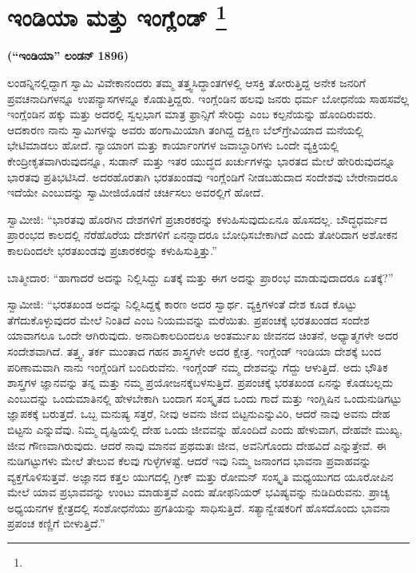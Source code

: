 
\chapter[ಇಂಡಿಯಾ ಮತ್ತು ಇಂಗ್ಲೆಂಡ್ ]{ಇಂಡಿಯಾ ಮತ್ತು ಇಂಗ್ಲೆಂಡ್ \protect\footnote{}}

\centerline{\textbf{(“ಇಂಡಿಯಾ” ಲಂಡನ್​ 1896)}}

ಲಂಡನ್ನಿನಲ್ಲಿದ್ದಾಗ ಸ್ವಾಮಿ ವಿವೇಕಾನಂದರು ತಮ್ಮ ತತ್ತ್ವಸಿದ್ಧಾಂತಗಳಲ್ಲಿ ಆಸಕ್ತಿ ತೋರುತ್ತಿದ್ದ ಅನೇಕ ಜನರಿಗೆ ಪ್ರವಚನಾದಿಗಳನ್ನೂ ಉಪನ್ಯಾಸಗಳನ್ನೂ ಕೊಡುತ್ತಿದ್ದರು. ಇಂಗ್ಲೆಂಡಿನ ಹಲವು ಜನರು ಧರ್ಮ ಬೋಧನೆಯ ಸಾಹಸವೆಲ್ಲ ಇಂಗ್ಲೆಂಡಿನ ಹಕ್ಕು ಮತ್ತು ಅದರಲ್ಲಿ ಸ್ವಲ್ಪಭಾಗ ಮಾತ್ರ ಫ್ರಾನ್ಸಿಗೆ ಸೇರಿದ್ದು ಎಂಬ ಕಲ್ಪನೆಯನ್ನು ಹೊಂದಿರುವರು. ಆದಕಾರಣ ನಾನು ಸ್ವಾಮಿಗಳನ್ನು ಅವರು ಹಂಗಾಮಿಯಾಗಿ ತಂಗಿದ್ದ ದಕ್ಷಿಣ ಬೆಲ್​ಗ್ರೇವಿಯಾದ ಮನೆಯಲ್ಲಿ ಭೇಟಿಮಾಡಲು ಹೋದೆ. ನ್ಯಾಯಾಂಗ ಮತ್ತು ಕಾರ್ಯಾಂಗಗಳ ಜವಾಬ್ದಾರಿಗಳು ಒಂದೇ ವ್ಯಕ್ತಿಯಲ್ಲಿ ಕೇಂದ್ರೀಕೃತವಾಗಿರುವುದನ್ನೂ, ಸುಡಾನ್​ ಮತ್ತು ಇತರ ಯುದ್ಧದ ಖರ್ಚುಗಳನ್ನು ಭಾರತದ ಮೇಲೆ ಹೇರಿರುವುದನ್ನೂ ಭಾರತವು ಪ್ರತಿಭಟಿಸಿದೆ. ಅದರ\break ಹೊರತಾಗಿ ಭರತಖಂಡವು ಇಂಗ್ಲೆಂಡಿಗೆ ನೀಡಬಹುದಾದ ಸಂದೇಶವು ಬೇರೇನಾದರೂ ಇದೆಯೇ ಎಂಬುದನ್ನು ಸ್ವಾಮೀಜಿಯೊಡನೆ ಚರ್ಚಿಸಲು ಅವರಲ್ಲಿಗೆ ಹೋದೆ.

ಸ್ವಾಮೀಜಿ: “ಭಾರತವು ಹೊರಗಿನ ದೇಶಗಳಿಗೆ ಪ್ರಚಾರಕರನ್ನು ಕಳುಹಿಸುವುದು\break ಏನೂ ಹೊಸದಲ್ಲ. ಬೌದ್ಧಧರ್ಮದ ಪ್ರಾರಂಭದ ಕಾಲದಲ್ಲಿ ನೆರೆಹೊರೆಯ ದೇಶಗಳಿಗೆ ಏನನ್ನಾದರೂ ಬೋಧಿಸಬೇಕಾಗಿದೆ ಎಂದು ತೋರಿದಾಗ ಅಶೋಕನ ಕಾಲದಿಂದಲೇ ಭರತಖಂಡವು ಪ್ರಚಾರಕರನ್ನು ಕಳುಹಿಸುತ್ತಿತ್ತು.”

ಬಾತ್ಮೀದಾರ: “ಹಾಗಾದರೆ ಅದನ್ನು ನಿಲ್ಲಿಸಿದ್ದು ಏತಕ್ಕೆ ಮತ್ತು ಈಗ ಅದನ್ನು ಪ್ರಾರಂಭ ಮಾಡುವುದಾದರೂ ಏತಕ್ಕೆ?”

ಸ್ವಾಮೀಜಿ: “ಭರತಖಂಡ ಅದನ್ನು ನಿಲ್ಲಿಸಿದ್ದಕ್ಕೆ ಕಾರಣ ಅದರ ಸ್ವಾರ್ಥ. ವ್ಯಕ್ತಿಗಳಂತೆ ದೇಶ ಕೂಡ ಕೊಟ್ಟು ತೆಗೆದುಕೊಳ್ಳುವುದರ ಮೇಲೆ ನಿಂತಿದೆ ಎಂಬ ನಿಯಮವನ್ನು ಮರೆಯಿತು. ಪ್ರಪಂಚಕ್ಕೆ ಭರತಖಂಡದ ಸಂದೇಶ ಯಾವಾಗಲೂ ಒಂದೇ ಆಗಿರುವುದು. ಅನಾದಿಕಾಲದಿಂದಲೂ ಅಂತರ್ಮುಖ ಜೀವನದ ಚಿಂತನೆ, ಅಧ್ಯಾತ್ಮಗಳೇ ಅದರ ಸಂದೇಶವಾಗಿದೆ. ತತ್ತ್ವ, ತರ್ಕ ಮುಂತಾದ ಗಹನ ಶಾಸ್ತ್ರಗಳೇ ಅದರ ಕ್ಷೇತ್ರ. ಇಂಗ್ಲೆಂಡ್​ ಇಂಡಿಯಾ ದೇಶಕ್ಕೆ ಬಂದ ಪರಿಣಾಮವಾಗಿ ನಾನು ಇಂಗ್ಲೆಂಡಿಗೆ ಬಂದಿರುವೆನು. ಇಂಗ್ಲೆಂಡ್​ ನಮ್ಮ ದೇಶವನ್ನು ಗೆದ್ದು ಆಳುತ್ತಿದೆ. ಅದು ಭೌತಿಕ ಶಾಸ್ತ್ರಗಳ ಜ್ಞಾನವನ್ನು ತನ್ನ ಮತ್ತು ನಮ್ಮ ಪ್ರಯೋಜನಕ್ಕೆ\break ಬಳಸುತ್ತಿದೆ. ಪ್ರಪಂಚಕ್ಕೆ ಭರತಖಂಡ ಏನನ್ನು ಕೊಡಬಲ್ಲದು ಎಂಬುದನ್ನು ಒಂದು\break ಮಾತಿನಲ್ಲಿ ಹೇಳಬೇಕಾಗಿ ಬಂದಾಗ ಸಂಸ್ಕೃತದ ಒಂದು ಗಾದೆ ಮತ್ತು ಇಂಗ್ಲಿಷಿನ ಒಂದು\break ನುಡಿಗಟ್ಟು ಜ್ಞಾಪಕಕ್ಕೆ ಬರುತ್ತದೆ. ಒಬ್ಬ ಮನುಷ್ಯ ಸತ್ತರೆ, ನೀವು ಅವನು ಜೀವ ಬಿಟ್ಟನು\break ಎನ್ನುವಿರಿ, ಆದರೆ ನಾವು ಅವನು ದೇಹ ಬಿಟ್ಟನು ಎನ್ನುವೆವು. ನಿಮ್ಮ ದೃಷ್ಟಿಯಲ್ಲಿ ದೇಹ ಒಂದು ಜೀವವನ್ನು ಹೊಂದಿದೆ ಎಂದು ಹೇಳುವಾಗ, ದೇಹವೇ ಮುಖ್ಯ, ಜೀವ ಗೌಣವಾಗಿರುವುದು. ಆದರೆ ನಾವು ಮಾನವ ಪ್ರಥಮತಃ ಜೀವ, ಅವನಿಗೊಂದು ದೇಹವಿದೆ ಎನ್ನುತ್ತೇವೆ. ಈ ನುಡಿಗಟ್ಟುಗಳು ಮೇಲೆ ತೇಲುವ ಕೆಲವು ಗುಳ್ಳೆಗಳಷ್ಟೆ. ಆದರೆ ಇವು ನಿಮ್ಮ ಜನಾಂಗದ ಭಾವನಾ ಪ್ರವಾಹವನ್ನು ವ್ಯಕ್ತಗೊಳಿಸುತ್ತವೆ. ಅಜ್ಞಾನದ ಕತ್ತಲ ಯುಗದಲ್ಲಿ ಗ್ರೀಕ್​ ಮತ್ತು ರೋಮನ್​ ಸಂಸ್ಕೃತಿ ಮಧ್ಯಯುಗದ ಯೂರೋಪಿನ ಮೇಲೆ ಯಾವ ಪ್ರಭಾವವನ್ನು ಉಂಟು ಮಾಡುತ್ತವೆ ಎಂದು ಷೋಫನಿಯರ್​ ಭವಿಷ್ಯವನ್ನು ನುಡಿದಿರುವನು. ಪ್ರಾಚ್ಯ ಅಧ್ಯಯನಗಳ ಕ್ಷೇತ್ರದಲ್ಲಿ ಸಂಶೋಧನೆಯು ಪ್ರಗತಿಯನ್ನು ಸಾಧಿಸುತ್ತಿದೆ. ಸತ್ಯಾನ್ವೇಷಕರಿಗೆ ಹೊಸದೊಂದು ಭಾವನಾ ಪ್ರಪಂಚ ಕಣ್ಣಿಗೆ ಬೀಳುತ್ತಿದೆ.”

